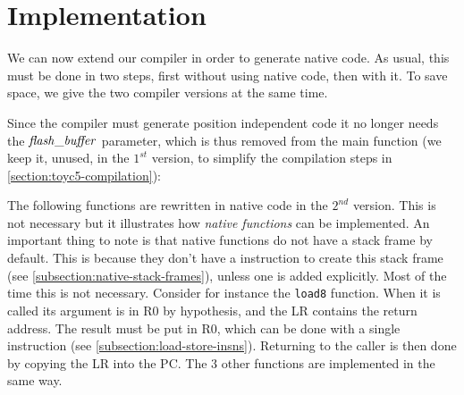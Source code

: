 \section{Implementation}\label{section:toyc5-implementation}


We can now extend our compiler in order to generate native code. As usual, this
must be done in two steps, first without using native code, then with it. To
save space, we give the two compiler versions at the same time.

Since the compiler must generate position independent code it no longer needs
the $\it{flash\_buffer}$ parameter, which is thus removed from the main
function (we keep it, unused, in the $1^{st}$ version, to simplify the
compilation steps in \cref{section:toyc5-compilation}):


The following functions are rewritten in native code in the $2^{nd}$ version.
This is not necessary but it illustrates how {\em native functions} can be
implemented. An important thing to note is that native functions do not have a
stack frame by default. This is because they don't have a 
instruction to create this stack frame (see
\cref{subsection:native-stack-frames}), unless one is added explicitly. Most of
the time this is not necessary. Consider for instance the {\tt load8} function.
When it is called its argument is in R0 by hypothesis, and the LR contains the
return address. The result must be put in R0, which can be done with a single
 instruction (see \cref{subsection:load-store-insns}). Returning to
the caller is then done by copying the LR into the PC. The 3 other functions
are implemented in the same way.


